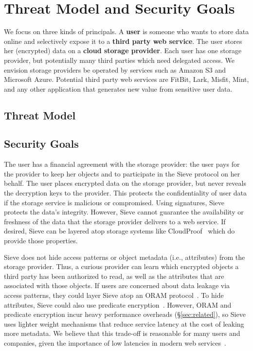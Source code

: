 \chapter{Threat Model and Security Goals}
\label{sec:threatModel}

We focus on three kinds of principals. A
\textbf{user} is someone who wants to store
data online and selectively expose it
to a \textbf{third party web service}. The
user stores her (encrypted) data on a
\textbf{cloud storage provider}. Each
user has one storage provider, but
potentially many third parties which
need delegated access. We envision storage
providers be operated by services 
such as Amazon S3 and Microsoft
Azure. Potential third party web services
are FitBit, Lark, Misfit, Mint, and 
any other application that generates new value
from sensitive user data.

\section{Threat Model}


\section{Security Goals}
The user has a financial agreement with
the storage provider: the user pays for the provider 
to keep her objects and to participate in the
Sieve protocol on her behalf.
The user places encrypted data on the
storage provider, but never reveals
the decryption keys to the provider. 
This protects the confidentiality of
user data if the storage service is
malicious or compromised. Using signatures,
Sieve protects the data's
integrity. However, Sieve cannot
guarantee the availability or freshness
of the data that the storage provider
delivers to a web service. If desired,
Sieve can be layered atop storage
systems like CloudProof~\cite{cloudproof}
which do provide those properties.

Sieve does not hide access patterns
or object metadata (i.e., attributes) from
the storage provider. Thus, a curious
provider can learn which encrypted
objects a third party has been authorized
to read, as well as the attributes
that are associated with those objects.
If users are concerned about data
leakage via access patterns, they
could layer Sieve atop an ORAM
protocol~\cite{shroud}. To hide attributes,
Sieve could also use predicate encryption~\cite{katz2008,shen2009}.
However, ORAM and predicate encryption
incur heavy performance overheads
(\S\ref{sec:related}), so Sieve uses
lighter weight mechanisms that reduce
service latency at the cost of leaking
more metadata. We believe that this
trade-off is reasonable for many users
and companies, given the importance
of low latencies in modern web services~\cite{wprof,bobtail}.

